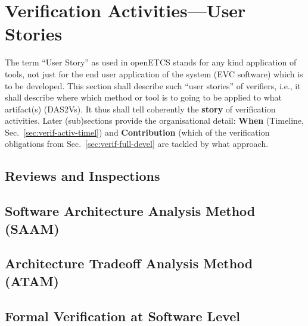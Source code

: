 \section{Verification Activities---User Stories}
\label{sec:verif-activ-user}

The term ``User Story'' as used in openETCS stands for any kind
application of tools, not just for the end user application of the
system (EVC software) which is to be developed. This section shall
describe such ``user stories'' of verifiers, i.e., it
shall describe where which method or tool is to going to be applied to
what artifact(s) (DAS2Vs). It thus shall tell coherently the
\textbf{story} of verification activities. Later (sub)sections provide
the organisational detail: \textbf{When} (Timeline,
Sec.~\ref{sec:verif-activ-timel}) and \textbf{Contribution} (which of
the verification obligations from Sec.~\ref{sec:verif-full-devel} are
tackled by what approach.



\subsection{Reviews and Inspections}
\label{sec:reviews-inspec-openETCS}



\subsection{Software Architecture Analysis Method (SAAM)}
\label{sec:saam-openETCS}



\subsection{Architecture Tradeoff Analysis Method (ATAM)}	
\label{sec:atam-openETCS}



\subsection{Formal Verification at Software Level}
\label{sec:form-verif-soft-openETCS}

